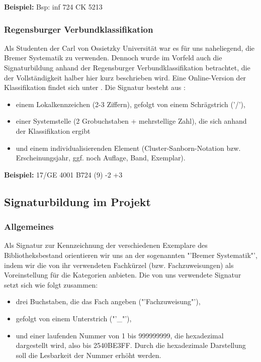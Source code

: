 \noindent \textbf{Beispiel:} Bsp: inf 724 CK 5213 



\subsubsection{Regensburger Verbundklassifikation}

Als Studenten der Carl von Ossietzky Universit\"at war es f\"ur uns naheliegend, die Bremer Systematik
zu verwenden. Dennoch wurde im Vorfeld auch die Signaturbildung anhand der Regensburger Verbundklassifikation 
betrachtet, die der Vollst\"andigkeit halber hier kurz beschrieben wird. 
Eine Online-Version der Klassifikation findet sich unter \cite{rvk}.
Die Signatur besteht aus \cite{sig_regensburg}:
\begin{itemize}
\item einem Lokalkennzeichen (2-3 Ziffern), gefolgt von einem Schr\"agstrich ('/'),
\item einer Systemstelle (2 Grobuchstaben + mehrstellige Zahl), die sich anhand der Klassifikation ergibt
\item und einem individualisierenden Element (Cluster-Sanborn-Notation bzw. 
   Erscheinungsjahr, ggf. noch Auflage, Band, Exemplar).
\end{itemize}

\noindent \textbf{Beispiel:} 17/GE 4001 B724 (9) -2 +3

\subsection{Signaturbildung im Projekt}

\subsubsection{Allgemeines}

Als Signatur zur Kennzeichnung der verschiedenen Exemplare des
Bibliotheksbestand orientieren wir uns an der sogenannten "'Bremer Systematik"',
indem wir die von ihr verwendeten Fachk\"urzel (bzw. Fachzuweisungen) 
als Voreinstellung f\"ur die Kategorien anbieten.
Die von uns verwendete Signatur setzt sich wie folgt zusammen:

\begin{itemize}

    \item drei Buchstaben, die das Fach angeben ("'Fachzuweisung"'),

    \item gefolgt von einem Unterstrich ("'\_"'),
    
    \item und einer laufenden Nummer von 1 bis 999999999, die hexadezimal dargestellt wird, also
      bis 2540BE3FF. Durch die hexadezimale Darstellung soll die Lesbarkeit der Nummer 
      erh\"oht werden.
    
\end{itemize}




